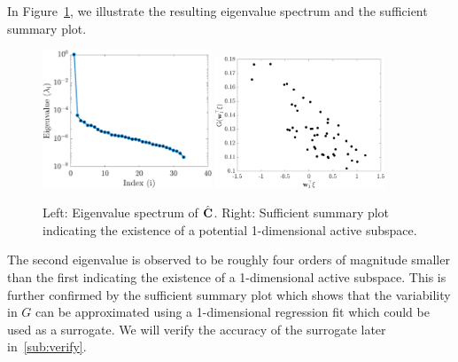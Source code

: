 In Figure~\ref{fig:hd}, we illustrate the resulting eigenvalue spectrum and the sufficient summary 
plot.
%
\begin{figure}[htbp]
 \begin{center}
   \includegraphics[width=0.45\textwidth]{./Figures/eig_33D}
   \includegraphics[width=0.45\textwidth]{./Figures/ssp_33D}
\caption{Left: Eigenvalue spectrum of $\hat{\mathbf{{C}}}$. Right: Sufficient summary plot indicating the
existence of a potential 1-dimensional active subspace.} 
\label{fig:hd}
\end{center}
\end{figure}
%
The second eigenvalue is observed to be roughly four orders of magnitude smaller than the first 
indicating the existence of a 1-dimensional active subspace. This is further confirmed by the sufficient
summary plot which shows that the variability in $G$ can be approximated using a 1-dimensional regression
fit which could be used as a surrogate. We will verify the accuracy of the surrogate later in~\ref{sub:verify}.

